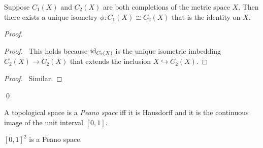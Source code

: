 \begin{thm}
  Suppose $C_1(X)$ and $C_2(X)$ are both completions of the metric space $X$. Then there exists a unique isometry $\phi : C_1(X) \cong C_2(X)$ that is the identity on $X$.
\end{thm}

\begin{proof}
  \pf
  \begin{proof}
    \pf\ This holds because $\mathrm{id}_{C_2(X)}$ is the unique isometric imbedding $C_2(X) \rightarrow C_2(X)$ that extends the inclusion $X \hookrightarrow C_2(X)$.
  \end{proof}
  \begin{proof}
    \pf\ Similar.
  \end{proof}
  \qed
\end{proof}

\begin{df}
  A topological space is a \emph{Peano space} iff it is Hausdorff and it is the continuous image of the unit interval $[0,1]$.
\end{df}

\begin{thm}
  $[0,1]^2$ is a Peano space.
\end{thm}

